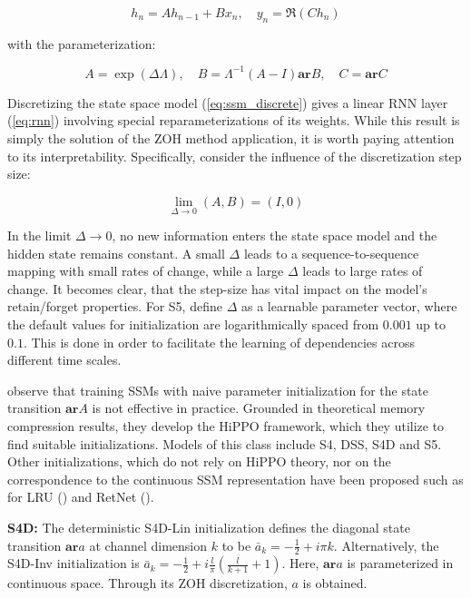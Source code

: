 \begin{equation}\label{eq:ssm_discrete}
h_n = A h_{n-1} + B x_n, \quad y_n = \Re(C h_n)
\end{equation}

with the parameterization:

\begin{equation}
A = \exp(\Delta \Lambda), \quad B = \Lambda^{-1}(A-I)\mathbf{ar}{B}, \quad C = \mathbf{ar}{C}
\end{equation}

Discretizing the state space model (\ref{eq:ssm_discrete}) gives a linear RNN layer (\ref{eq:rnn}) involving special reparameterizations of its weights. While this result is simply the solution of the ZOH method application, it is worth paying attention to its interpretability. Specifically, consider the influence of the discretization step size:

\begin{equation}
\lim_{{\Delta \to 0}}(A, B) = (I, 0)
\end{equation}

In the limit $\Delta \to 0$, no new information enters the state space model and the hidden state remains constant. A small $\Delta$ leads to a sequence-to-sequence mapping with small rates of change, while a large $\Delta$ leads to large rates of change. It becomes clear, that the step-size has vital impact on the model's retain/forget properties. For S5, \cite{smith2023simplified} define $\Delta$ as a learnable parameter vector, where the default values for initialization are logarithmically spaced from $0.001$ up to $0.1$. This is done in order to facilitate the learning of dependencies across different time scales. 

\cite{gu2022efficiently} observe that training SSMs with naive parameter initialization for the state transition $\mathbf{ar}{A}$ is not effective in practice. Grounded in theoretical memory compression results, they develop the HiPPO framework, which they utilize to find suitable initializations. Models of this class include S4, DSS, S4D and S5. Other initializations, which do not rely on HiPPO theory, nor on the correspondence to the continuous SSM representation have been proposed such as for LRU (\cite{orvieto2023resurrecting}) and RetNet (\cite{sun2023retentive}). 

\textbf{S4D:} The deterministic S4D-Lin initialization defines the diagonal state transition $\mathbf{ar}{a}$ at channel dimension $k$ to be \( \bar{a}_k = -\frac{1}{2} + i \pi k\). Alternatively, the S4D-Inv initialization is $\bar{a}_k = -\frac{1}{2} + i\frac{l}{\pi} (\frac{l}{k+1} + 1)$. Here, $\mathbf{ar}{a}$ is parameterized in continuous space. Through its ZOH discretization, $a$ is obtained.

